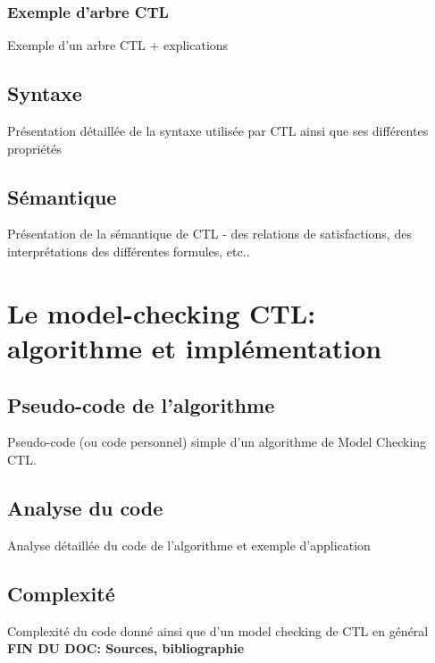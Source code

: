 \documentclass[runningheads,a4paper,11pt]{llncs}
\begin{document}
\subsubsection{Exemple d'arbre CTL}
Exemple d'un arbre CTL + explications

\subsection{Syntaxe}
Présentation détaillée de la syntaxe utilisée par CTL ainsi que ses différentes propriétés 

\subsection{Sémantique}
Présentation de la sémantique de CTL - des relations de satisfactions, des interprétations des différentes formules, etc.. 

\section{Le model-checking CTL: algorithme et implémentation}
\subsection{Pseudo-code de l'algorithme}
Pseudo-code (ou code personnel) simple d'un algorithme de Model Checking CTL. 

\subsection{Analyse du code}
Analyse détaillée du code de l'algorithme et exemple d'application 

\subsection{Complexité}
Complexité du code donné ainsi que d'un model checking de CTL en général \\ 

\textbf{FIN DU DOC: Sources, bibliographie} 


\nocite{*} 
\end{document}

